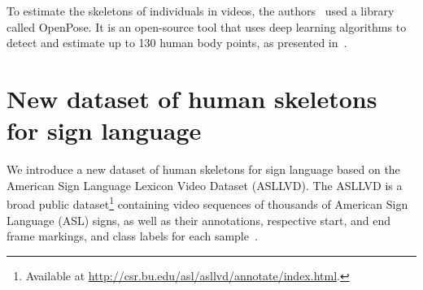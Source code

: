 

To estimate the skeletons of individuals in videos, the authors~\cite{st-gcn-2018} used a library called OpenPose. It is an open-source tool that uses deep learning algorithms to detect and estimate up to 130 human body points, as presented in~\cite{cao-realtime-2017,simon-hand-2017,wei-cpm-2016}.



\section{New dataset of human skeletons for sign language} 
\label{sec:new-dataset}

We introduce a new dataset of human skeletons for sign language based on the American Sign Language Lexicon Video Dataset (ASLLVD). The ASLLVD  is a broad public dataset\footnote{ Available at \url{http://csr.bu.edu/asl/asllvd/annotate/index.html}.} containing video sequences of thousands of American Sign Language (ASL) signs, as well as their annotations, respective start, and end frame markings, and class labels for each sample~\cite{athitsos-asllvd-2008,neidle-2012,vloger-2012}.

